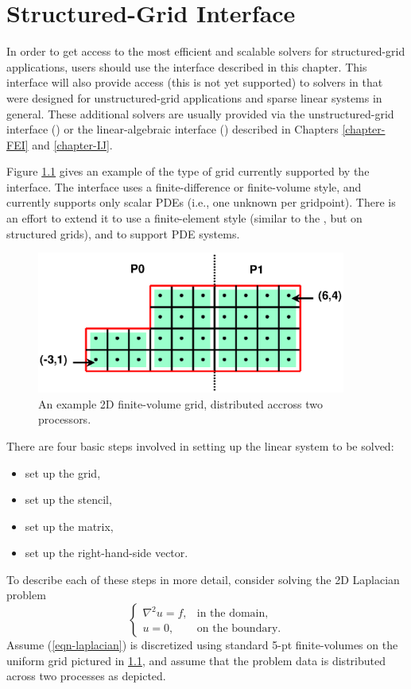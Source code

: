 \chapter{Structured-Grid Interface}
\label{Structured-Grid Interface}

In order to get access to the most efficient and scalable solvers for
structured-grid applications, users should use the 
interface described in this chapter.  This interface will also provide
access (this is not yet supported) to solvers in \hypre{} that were
designed for unstructured-grid applications and sparse linear systems
in general.  These additional solvers are usually provided via the
unstructured-grid interface () or the linear-algebraic
interface () described in Chapters \ref{chapter-FEI} and
\ref{chapter-IJ}.

Figure \ref{fig-fv-grid} gives an example of the type of grid
currently supported by the  interface.  The interface
uses a finite-difference or finite-volume style, and currently
supports only scalar PDEs (i.e., one unknown per gridpoint).  There is
an effort to extend it to use a finite-element style (similar to the
, but on structured grids), and to support PDE systems.
\begin{figure}
\centering
\includegraphics[width=4in]{fv_grid.eps}
\caption{%
An example 2D finite-volume grid, distributed accross two processors.}
\label{fig-fv-grid}
\end{figure}

There are four basic steps involved in setting up the linear system
to be solved:
\begin{itemize}
\item set up the grid,
\item set up the stencil,
\item set up the matrix,
\item set up the right-hand-side vector.
\end{itemize}
To describe each of these steps in more detail, consider solving the
2D Laplacian problem
\begin{equation}\label{eqn-laplacian}
\left \{
\begin{array}{ll}
\nabla^2 u = f , & \mbox{in the domain}, \\
u = 0,           & \mbox{on the boundary}.
\end{array}
\right .
\end{equation}
Assume (\ref{eqn-laplacian}) is discretized using standard 5-pt
finite-volumes on the uniform grid pictured in \ref{fig-fv-grid}, and
assume that the problem data is distributed across two processes as
depicted.


